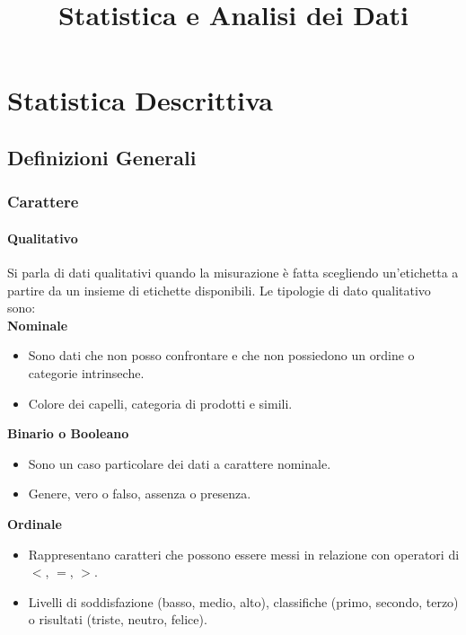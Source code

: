 \documentclass[11pt]{report}
\title{{\titlefont Statistica e Analisi dei Dati}}
\date{}
\author{}
\begin{document}
\maketitle

\tableofcontents

\part{Statistica Descrittiva}

\chapter{Definizioni Generali}

\section{Carattere}

\subsection{Qualitativo}
Si parla di dati qualitativi quando la misurazione è fatta scegliendo un'etichetta a partire da un insieme di etichette disponibili. Le tipologie di dato qualitativo sono:\\
\textbf{Nominale}
\begin{itemize}
    \item Sono dati che non posso confrontare e che non possiedono un ordine o categorie intrinseche.
    \item Colore dei capelli, categoria di prodotti e simili.
\end{itemize}
\textbf{Binario o Booleano}
\begin{itemize}
    \item Sono un caso particolare dei dati a carattere nominale.
    \item Genere, vero o falso, assenza o presenza.
\end{itemize}
\textbf{Ordinale}
\begin{itemize}
    \item Rappresentano caratteri che possono essere messi in relazione con operatori di $<$, $=$, $>$.
    \item Livelli di soddisfazione (basso, medio, alto), classifiche (primo, secondo, terzo) o risultati (triste, neutro, felice).
\end{itemize}
\end{document}
